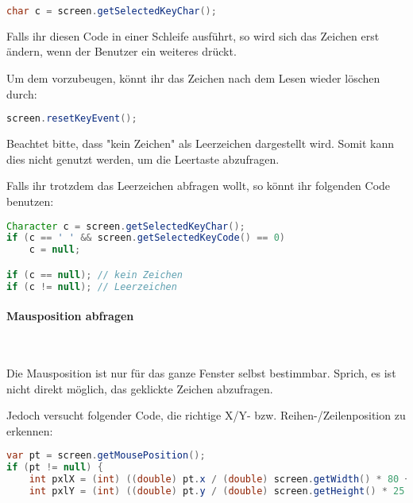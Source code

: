 \documentclass[12pt,a4paper]{article}
\begin{document}
\begin{tcolorbox}[frame empty,nobeforeafter,colback=gray!5]
\begin{lstlisting}[language=java,basicstyle=\ttfamily]
char c = screen.getSelectedKeyChar();
\end{lstlisting}
\end{tcolorbox}

Falls ihr diesen Code in einer Schleife ausführt, so wird sich das Zeichen erst ändern, wenn der Benutzer ein weiteres drückt.

Um dem vorzubeugen, könnt ihr das Zeichen nach dem Lesen wieder löschen durch:

\begin{tcolorbox}[frame empty,nobeforeafter,colback=gray!5]
\begin{lstlisting}[language=java,basicstyle=\ttfamily]
screen.resetKeyEvent();
\end{lstlisting}
\end{tcolorbox}

Beachtet bitte, dass "kein Zeichen" als Leerzeichen dargestellt wird. Somit kann dies nicht genutzt werden, um die Leertaste abzufragen.

Falls ihr trotzdem das Leerzeichen abfragen wollt, so könnt ihr folgenden Code benutzen:

\begin{tcolorbox}[frame empty,nobeforeafter,colback=gray!5]
\begin{lstlisting}[language=java,basicstyle=\ttfamily]
Character c = screen.getSelectedKeyChar();
if (c == ' ' && screen.getSelectedKeyCode() == 0)
    c = null;

if (c == null); // kein Zeichen
if (c != null); // Leerzeichen
\end{lstlisting}
\end{tcolorbox}

\paragraph{Mausposition abfragen}\

Die Mausposition ist nur für das ganze Fenster selbst bestimmbar. Sprich, es ist nicht direkt möglich, das geklickte Zeichen abzufragen.

Jedoch versucht folgender Code, die richtige X/Y- bzw. Reihen-/Zeilenposition zu erkennen:

\begin{tcolorbox}[frame empty,nobeforeafter,colback=gray!5]
\begin{lstlisting}[language=java,basicstyle=\ttfamily]
var pt = screen.getMousePosition();
if (pt != null) {
    int pxlX = (int) ((double) pt.x / (double) screen.getWidth() * 80 + .5d);
    int pxlY = (int) ((double) pt.y / (double) screen.getHeight() * 25 - .5d);
\end{lstlisting}
\end{tcolorbox}
\end{document}
